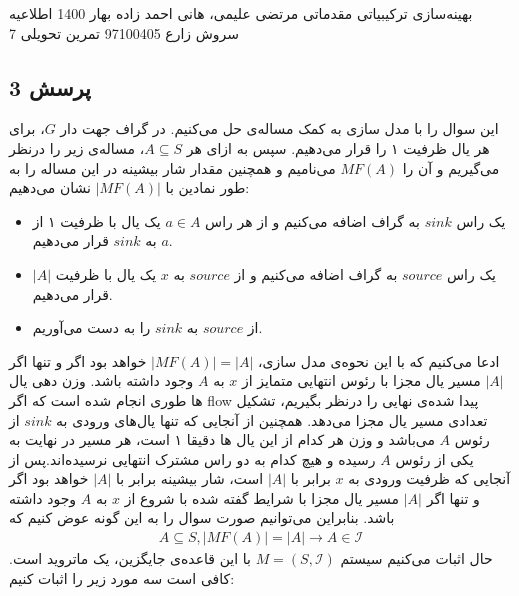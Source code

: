 \documentclass[a4paper,12pt]{article}
\newcounter{problemcounter}
\newcounter{subproblemcounter}
\newcommand{\problem}[1]
{
	\subsection*{
		پرسش
		#1
	}
}
\begin{document}
\handout
{بهینه‌سازی ترکیبیاتی مقدماتی}
{مرتضی علیمی، هانی احمد زاده}
{بهار 1400}
{اطلاعیه}
{سروش زارع}
{97100405}
 {تمرین تحویلی 7}
\problem{3}
این سوال را با مدل سازی به کمک مساله‌ی  حل می‌کنیم.
در گراف جهت دار $G$، برای هر یال ظرفیت ۱ را قرار می‌دهیم. سپس به ازای هر 
$A \subseteq S$، 
مساله‌ی  زیر را درنظر می‌گیریم و آن را $MF(A)$ می‌نامیم و همچنین مقدار شار بیشینه در این مساله را به طور نمادین با $|MF(A)|$ نشان می‌دهیم:
\begin{itemize}
	\item یک راس $sink$ به گراف اضافه می‌کنیم و از هر راس $a \in A$ یک یال با ظرفیت ۱ از $a$ به $sink$ قرار می‌دهیم.
	\item یک راس $source$ به گراف اضافه می‌کنیم و از $source$ به $x$ یک یال با ظرفیت $|A|$ قرار می‌دهیم.
	\item {} از $source$ به $sink$ را به دست می‌آوریم.
\end{itemize}
ادعا می‌کنیم که با این نحوه‌ی مدل سازی، 
$|MF(A)| = |A|$
 خواهد بود اگر و تنها اگر $|A|$ مسیر یال مجزا با رئوس انتهایی متمایز از $x$  به $A$ وجود داشته باشد.
\proof{}
وزن دهی یال ها طوری انجام شده است که اگر flow پیدا شده‌ی نهایی را درنظر بگیریم، تشکیل تعدادی مسیر یال مجزا می‌دهد. همچنین از آنجایی که تنها یال‌های ورودی به $sink$ از رئوس $A$ می‌باشد و وزن هر کدام از این یال ها دقیقا ۱ است، هر مسیر در نهایت به یکی از رئوس $A$ رسیده و هیچ کدام به دو راس مشترک انتهایی نرسیده‌اند.پس از آنجایی که ظرفیت ورودی به $x$ برابر با $|A|$ است، شار بیشینه برابر با $|A|$ خواهد بود اگر و تنها اگر  $|A|$ مسیر یال مجزا با شرایط گفته شده با شروع از $x$ به $A$ وجود داشته باشد.
بنابراین می‌توانیم صورت سوال را به این گونه عوض کنیم که
\begin{align*}
	A \subseteq S, |MF(A)| = |A| \rightarrow A \in \mathcal{I}
\end{align*}
حال اثبات می‌کنیم سیستم
$M = (S, \mathcal{I})$
با این قاعده‌ی جایگزین، یک ماتروید است. کافی است سه مورد زیر را اثبات کنیم:
\end{document}
